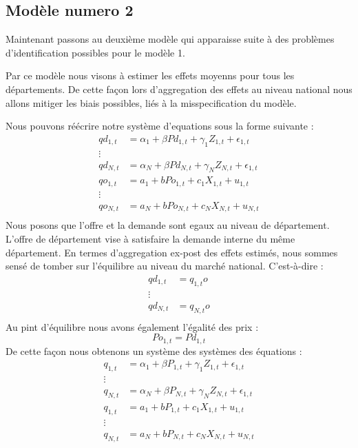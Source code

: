 \documentclass[11pt, a4paper]{article}
\begin{document}
\subsection{Modèle numero 2}
Maintenant passons au deuxième modèle qui apparaisse suite à des problèmes d'identification possibles pour le modèle 1. 
\par
Par ce modèle nous visons à estimer les effets moyenns pour tous les départements. 
De cette façon lors d'aggregation des effets au niveau national nous allons mitiger les biais possibles, liés à la misspecification du modèle.
\par
Nous pouvons réécrire notre système d'equations sous la forme suivante :
\begin{align*}
  qd_{1,t} & = \alpha_{1} + \beta Pd_{1,t} + \gamma_{1} Z_{1,t} + \epsilon_{1,t}  \\
  \vdots \\ 
  qd_{N,t} & = \alpha_{N} + \beta Pd_{N,t} + \gamma_{N} Z_{N,t} + \epsilon_{1,t}  \\
  qo_{1,t} & = a_1 + b Po_{1,t} + c_1 X_{1,t} + u_{1,t} \\ 
  \vdots \\ 
  qo_{N,t} & = a_N + b Po_{N,t} + c_N X_{N,t} + u_{N,t} \\
\end{align*}
Nous posons que l'offre et la demande sont egaux au niveau de département. 
L'offre de département vise à satisfaire la demande interne du même département. 
En termes d'aggregation ex-post des effets estimés, nous sommes sensé de tomber sur l'équilibre au niveau du marché national. 
C'est-à-dire :
\begin{align*}
  qd_{1,t} & = q_{1,t}o \\
  \vdots \\ 
  qd_{N,t} & = q_{N,t}o \\
\end{align*}
Au pint d'équilibre nous avons également l'égalité des prix :
\begin{equation*}
  Po_{1,t} = Pd_{1,t}
\end{equation*}
De cette façon nous obtenons un système des systèmes des équations :
\begin{align*}
  q_{1,t} & = \alpha_{1} + \beta P_{1,t} + \gamma_{1} Z_{1,t} + \epsilon_{1,t}  \\
  \vdots \\ 
  q_{N,t} & = \alpha_{N} + \beta P_{N,t} + \gamma_{N} Z_{N,t} + \epsilon_{1,t}  \\
  q_{1,t} & = a_1 + b P_{1,t} + c_1 X_{1,t} + u_{1,t} \\ 
  \vdots \\ 
  q_{N,t} & = a_N + b P_{N,t} + c_N X_{N,t} + u_{N,t} \\
\end{align*}
\end{document}

